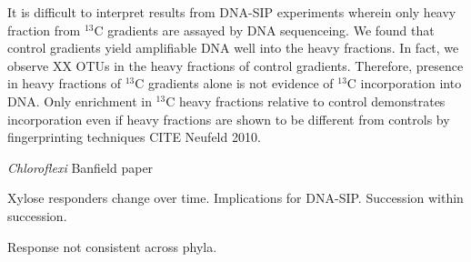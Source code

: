 It is difficult to interpret results from DNA-SIP experiments wherein only heavy
fraction from $^{13}$C gradients are assayed by DNA sequenceing. We found that control
gradients yield amplifiable DNA well into the heavy fractions. In fact, we observe XX
OTUs in the heavy fractions of control gradients. Therefore, presence in heavy fractions of
$^{13}$C gradients alone is not evidence of $^{13}$C incorporation into DNA. Only enrichment
in $^{13}$C heavy fractions relative to control demonstrates incorporation even if heavy
fractions are shown to be different from controls by fingerprinting techniques
CITE Neufeld 2010.

\textit{Chloroflexi} Banfield paper

Xylose responders change over time. Implications for DNA-SIP. Succession within succession.

Response not consistent across phyla.

